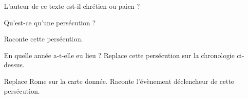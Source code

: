 \documentclass[a4paper,12pt]{exam}
\newcommand{\rep}[1]{}
\newcommand{\rep}[1]{\fillwithdottedlines{#1}}
\begin{document}
\begin{questions}
 \question[1] L'auteur de ce texte est-il chrétien ou paien ?
        \rep{1cm}
 
 \question[1] Qu'est-ce qu'une persécution ?
        \rep{2cm}
  \question[2] Raconte cette persécution.
         \rep{2cm}
   \question[2] En quelle année a-t-elle eu lieu ? Replace cette persécution sur la chronologie ci-dessus.
          \rep{1cm}
    \question[1] Replace Rome sur la carte donnée.
    \question[1] Raconte l'évènement déclencheur de cette persécution.
           \rep{2cm}
     
     
     


 \end{questions}
\end{document}
